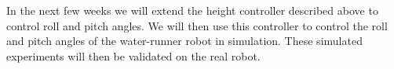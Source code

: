 In the next few weeks we will extend the height controller described above to control roll and pitch angles. We will then use this controller to control the roll and pitch angles of the water-runner robot in simulation. These simulated experiments will then be validated on the real robot.
